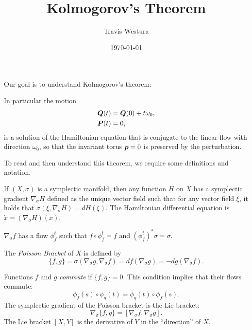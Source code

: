 \documentclass[twoside,letterpaper,10pt]{article}
\title{Kolmogorov's Theorem}
\author{Travis Westura}
\date{\today}
\newcommand{\sgrad}{\nabla_{\sigma}}
\begin{document}
\maketitle

Our goal is to understand Kolmogorov's theorem:
\begin{thm}
  \KAM
\end{thm}
In particular the motion
\begin{align*}
  \bm{Q}(t) &= \bm{Q}(0) + t\omega_0,\\
  \bm{P}(t) &= 0,
\end{align*}
is a solution of the Hamiltonian equation that is conjugate to the linear flow
with direction $\omega_0$, so that the invariant torus $\bm{p} = 0$ is preserved
by the perturbation.

To read and then understand this theorem, we require some definitions and
notation.

If $(X, \sigma)$ is a symplectic manifold, then any function $H$ on $X$ has a
symplectic gradient $\sgrad H$ defined as the unique vector field such that for
any vector field $\xi$, it holds that $\sigma(\xi, \sgrad H) = d H(\xi)$.
The Hamiltonian differential equation is $\dot{x} = (\sgrad H)(x)$.

$\sgrad f$ has a flow $\phi^t_f$ such that $f \circ \phi^t_f = f$ and
$(\phi^t_f)^* \sigma = \sigma$.

\begin{defn}
The \emph{Poisson Bracket} of $X$ is defined by
  \begin{equation*}
    \{f, g\} = \sigma(\sgrad g, \sgrad f) = df(\sgrad g) = - dg(\sgrad f).
  \end{equation*}
\end{defn}
Functions $f$ and $g$ \emph{commute} if $\{f, g\} = 0$.
This condition implies that their flows commute:
\begin{equation*}
  \phi_f(s) \circ \phi_g(t) = \phi_g(t) \circ \phi_f(s).
\end{equation*}
The symplectic gradient of the Poisson bracket is the Lie bracket:
\begin{equation*}
  \sgrad\{f, g\} = [\sgrad f, \sgrad g].
\end{equation*}
The Lie bracket $[X, Y]$ is the derivative of $Y$ in the ``direction'' of $X$.
\end{document}
